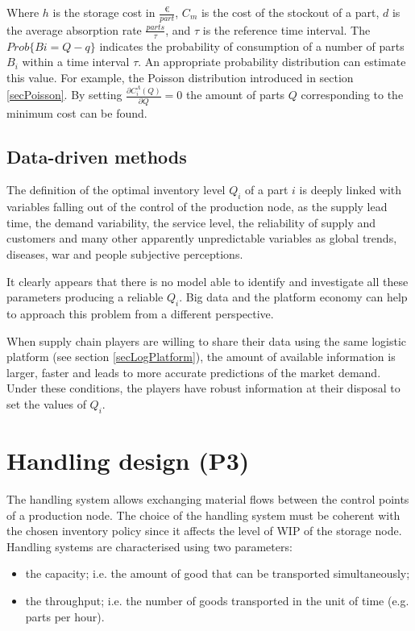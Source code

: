 Where $h$ is the storage cost in $\frac{\euro{} }{part}$, $C_m$ is the cost of the stockout of a part, $d$ is the average absorption rate $\frac{parts}{\tau}$, and $\tau$ is the reference time interval. The $Prob\{Bi=Q-q\}$ indicates the probability of consumption of a number of parts $B_i$ within a time interval $\tau$. An appropriate probability distribution can estimate this value. For example, the Poisson distribution introduced in section \ref{secPoisson}. By setting $\frac{\partial C_i^\Lambda\left(Q\right)}{\partial Q}=0$ the amount of parts $Q$ corresponding to the minimum cost can be found.

\subsection{Data-driven methods}
The definition of the optimal inventory level $Q_i$ of a part $i$ is deeply linked with variables falling out of the control of the production node, as the supply lead time, the demand variability, the service level, the reliability of supply and customers and many other apparently unpredictable variables as global trends, diseases, war and people subjective perceptions. \par

It clearly appears that there is no model able to identify and investigate all these parameters producing a reliable $Q_i$. Big data and the platform economy can help to approach this problem from a different perspective.\par

When supply chain players are willing to share their data using the same logistic platform (see section \ref{secLogPlatform}), the amount of available information is larger, faster and leads to more accurate predictions of the market demand. Under these conditions, the players have robust information at their disposal to set the values of $Q_i$. 

\section{Handling design (P3)}

The handling system allows exchanging material flows between the control points of a production node. The choice of the handling system must be coherent with the chosen inventory policy since it affects the level of WIP of the storage node. Handling systems are characterised using two parameters:

\begin{itemize}
    \item the capacity; i.e. the amount of good that can be transported simultaneously;
    \item the throughput; i.e. the number of goods transported in the unit of time (e.g. parts per hour).
\end{itemize}

